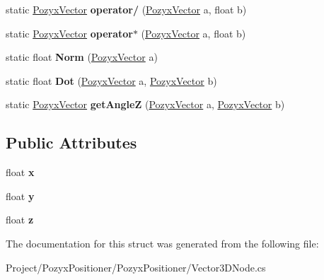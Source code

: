 \begin{DoxyCompactItemize}
static \hyperlink{struct_pozyx_positioner_1_1_framework_1_1_pozyx_vector}{Pozyx\+Vector} {\bfseries operator/} (\hyperlink{struct_pozyx_positioner_1_1_framework_1_1_pozyx_vector}{Pozyx\+Vector} a, float b)
\item 
\mbox{\label{struct_pozyx_positioner_1_1_framework_1_1_pozyx_vector_a6e4a83f759ad4ded707458ba8da2c4e3}} 
static \hyperlink{struct_pozyx_positioner_1_1_framework_1_1_pozyx_vector}{Pozyx\+Vector} {\bfseries operator$\ast$} (\hyperlink{struct_pozyx_positioner_1_1_framework_1_1_pozyx_vector}{Pozyx\+Vector} a, float b)
\item 
\mbox{\label{struct_pozyx_positioner_1_1_framework_1_1_pozyx_vector_a1dbaa4407ca3196f8b4de2d86e5ce395}} 
static float {\bfseries Norm} (\hyperlink{struct_pozyx_positioner_1_1_framework_1_1_pozyx_vector}{Pozyx\+Vector} a)
\item 
\mbox{\label{struct_pozyx_positioner_1_1_framework_1_1_pozyx_vector_a9f39baf405504f414136b7f9a661dad8}} 
static float {\bfseries Dot} (\hyperlink{struct_pozyx_positioner_1_1_framework_1_1_pozyx_vector}{Pozyx\+Vector} a, \hyperlink{struct_pozyx_positioner_1_1_framework_1_1_pozyx_vector}{Pozyx\+Vector} b)
\item 
\mbox{\label{struct_pozyx_positioner_1_1_framework_1_1_pozyx_vector_a1ba057e7ddbad697e8a8ed6322f8fe7f}} 
static \hyperlink{struct_pozyx_positioner_1_1_framework_1_1_pozyx_vector}{Pozyx\+Vector} {\bfseries get\+AngleZ} (\hyperlink{struct_pozyx_positioner_1_1_framework_1_1_pozyx_vector}{Pozyx\+Vector} a, \hyperlink{struct_pozyx_positioner_1_1_framework_1_1_pozyx_vector}{Pozyx\+Vector} b)
\end{DoxyCompactItemize}
\subsection*{Public Attributes}
\begin{DoxyCompactItemize}
\item 
\mbox{\label{struct_pozyx_positioner_1_1_framework_1_1_pozyx_vector_a8d0e8683da20dae755298604eefdae84}} 
float {\bfseries x}
\item 
\mbox{\label{struct_pozyx_positioner_1_1_framework_1_1_pozyx_vector_a5e04e95828f39963731121bcb6f62a4c}} 
float {\bfseries y}
\item 
\mbox{\label{struct_pozyx_positioner_1_1_framework_1_1_pozyx_vector_a1b44279d1786ffde514d431c1521c230}} 
float {\bfseries z}
\end{DoxyCompactItemize}


The documentation for this struct was generated from the following file\+:\begin{DoxyCompactItemize}
\item 
Project/\+Pozyx\+Positioner/\+Pozyx\+Positioner/Vector3\+D\+Node.\+cs\end{DoxyCompactItemize}
